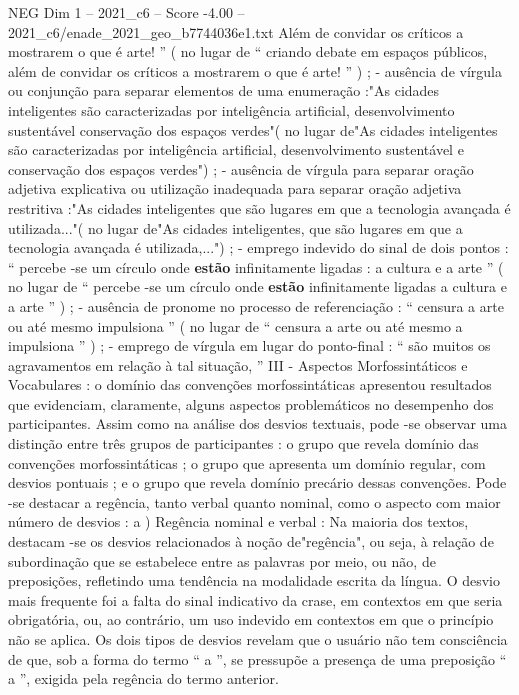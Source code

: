 \begin{textsample}{NEG Dim 1 – 2021\_c6 – Score -4.00 – 2021\_c6/enade\_2021\_geo\_b7744036e1.txt}
Além de convidar os críticos a mostrarem o que é arte! ” ( no lugar de “ criando debate em espaços públicos, além de convidar os críticos a mostrarem o que é arte! ” ) ; - ausência de vírgula ou conjunção para separar elementos de uma enumeração :"As cidades inteligentes são caracterizadas por inteligência artificial, desenvolvimento sustentável conservação dos espaços verdes"( no lugar de"As cidades inteligentes são caracterizadas por inteligência artificial, desenvolvimento sustentável e conservação dos espaços verdes") ; - ausência de vírgula para separar oração adjetiva explicativa ou utilização inadequada para separar oração adjetiva restritiva :"As cidades inteligentes que são lugares em que a tecnologia avançada é utilizada..."( no lugar de"As cidades inteligentes, que são lugares em que a tecnologia avançada é utilizada,...") ; - emprego indevido do sinal de dois pontos : “ percebe -se um círculo onde \textbf{estão} infinitamente ligadas : a cultura e a arte ” ( no lugar de “ percebe -se um círculo onde \textbf{estão} infinitamente ligadas a cultura e a arte ” ) ; - ausência de pronome no processo de referenciação : “ censura a arte ou até mesmo impulsiona ” ( no lugar de “ censura a arte ou até mesmo a impulsiona ” ) ; - emprego de vírgula em lugar do ponto-final : “ são muitos os agravamentos em relação à tal situação, ” III - Aspectos Morfossintáticos e Vocabulares : o domínio das convenções morfossintáticas apresentou resultados que evidenciam, claramente, alguns aspectos problemáticos no desempenho dos participantes.
Assim como na análise dos desvios textuais, pode -se observar uma distinção entre três grupos de participantes : o grupo que revela domínio das convenções morfossintáticas ; o grupo que apresenta um domínio regular, com desvios pontuais ; e o grupo que revela domínio precário dessas convenções.
Pode -se destacar a regência, tanto verbal quanto nominal, como o aspecto com maior número de desvios : a ) Regência nominal e verbal : Na maioria dos textos, destacam -se os desvios relacionados à noção de"regência", ou seja, à relação de subordinação que se estabelece entre as palavras por meio, ou não, de preposições, refletindo uma tendência na modalidade escrita da língua.
O desvio mais frequente foi a falta do sinal indicativo da crase, em contextos em que seria obrigatória, ou, ao contrário, um uso indevido em contextos em que o princípio não se aplica.
Os dois tipos de desvios revelam que o usuário não tem consciência de que, sob a forma do termo “ a ”, se pressupõe a presença de uma preposição “ a ”, exigida pela regência do termo anterior.

\end{textsample}
